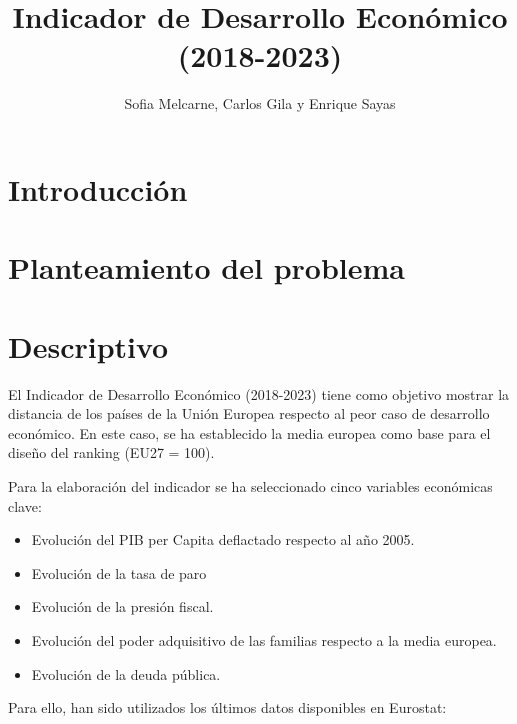 \documentclass[
  letterpaper,
  DIV=11,
  numbers=noendperiod]{scrartcl}
\title{Indicador de Desarrollo Económico (2018-2023)}
\author{Sofia Melcarne, Carlos Gila y Enrique Sayas}
\date{}
\providecommand{\tightlist}{%
  \setlength{\itemsep}{0pt}\setlength{\parskip}{0pt}}\usepackage{longtable,booktabs,array}
\renewcommand*\contentsname{Table of contents}
\newcommand\contentsname{Table of contents}
\begin{document}
\maketitle
\ifdefined\Shaded\renewenvironment{Shaded}{\begin{tcolorbox}[frame hidden, interior hidden, boxrule=0pt, enhanced, borderline west={3pt}{0pt}{shadecolor}, sharp corners, breakable]}{\end{tcolorbox}}\fi

\renewcommand*\contentsname{Table of contents}
{
\hypersetup{linkcolor=}
\setcounter{tocdepth}{3}
\tableofcontents
}
\hypertarget{introducciuxf3n}{%
\section{Introducción}\label{introducciuxf3n}}

\hypertarget{planteamiento-del-problema}{%
\section{Planteamiento del problema}\label{planteamiento-del-problema}}

\hypertarget{descriptivo}{%
\section{Descriptivo}\label{descriptivo}}

El Indicador de Desarrollo Económico (2018-2023) tiene como objetivo
mostrar la distancia de los países de la Unión Europea respecto al peor
caso de desarrollo económico. En este caso, se ha establecido la media
europea como base para el diseño del ranking (EU27 = 100).

Para la elaboración del indicador se ha seleccionado cinco variables
económicas clave:

\begin{itemize}
\tightlist
\item
  Evolución del PIB per Capita deflactado respecto al año 2005.
\item
  Evolución de la tasa de paro
\item
  Evolución de la presión fiscal.
\item
  Evolución del poder adquisitivo de las familias respecto a la media
  europea.
\item
  Evolución de la deuda pública.
\end{itemize}

Para ello, han sido utilizados los últimos datos disponibles en
Eurostat:
\end{document}
